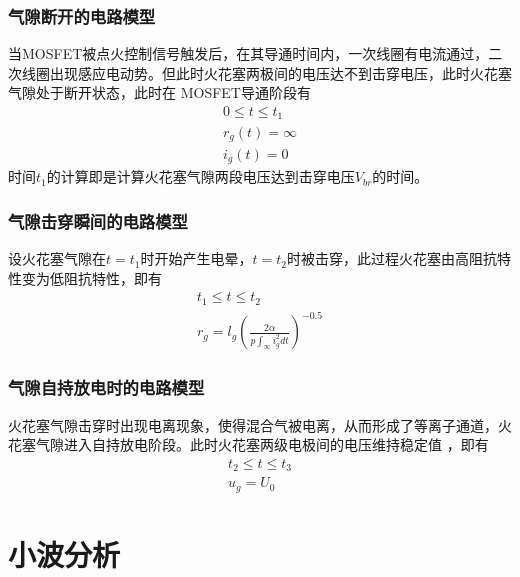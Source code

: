 \subsubsection*{气隙断开的电路模型}
当MOSFET被点火控制信号触发后，在其导通时间内，一次线圈有电流通过，二次线圈出现感应电动势。但此时火花塞两极间的电压达不到击穿电压，此时火花塞气隙处于断开状态，此时在
MOSFET导通阶段有
\begin{gather}
	0\leq t\leq t_{1} \\
	r_{g}(t)=\infty \\                     
	i_{g}(t)=0
\end{gather}
时间$t_{1}$的计算即是计算火花塞气隙两段电压达到击穿电压$V_{br}$的时间。
\subsubsection*{气隙击穿瞬间的电路模型}
设火花塞气隙在$t=t_{1}$时开始产生电晕，$t=t_{2}$时被击穿，此过程火花塞由高阻抗特性变为低阻抗特性，即有
\begin{gather}
	t_{1}\leq t \leq t_{2}\\
	r_{g}=l_{g}(\frac{2\alpha}{p\int_{\infty}i_{g}^{2}dt})^{-0.5}
\end{gather}
\subsubsection*{气隙自持放电时的电路模型}
火花塞气隙击穿时出现电离现象，使得混合气被电离，从而形成了等离子通道，火花塞气隙进入自持放电阶段。此时火花塞两级电极间的电压维持稳定值
\cite{sincero2008arc,tseng1997experimentally}，即有
\begin{gather}
	t_{2}\leq t \leq t_{3} \\
	u_{g}=U_{0}
\end{gather}
\section{小波分析}
